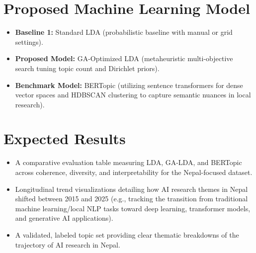 \documentclass[11pt,a4paper]{article}
\begin{document}
\section{Proposed Machine Learning Model}
\begin{itemize}
    \item \textbf{Baseline 1:} Standard LDA (probabilistic baseline
          with manual or grid settings).
    \item \textbf{Proposed Model:} GA-Optimized LDA (metaheuristic
          multi-objective search tuning topic count and Dirichlet
          priors).
    \item \textbf{Benchmark Model:} BERTopic (utilizing sentence
          transformers for dense vector spaces and HDBSCAN clustering
          to capture semantic nuances in local research).
\end{itemize}

\section{Expected Results}
\begin{itemize}
    \item A comparative evaluation table measuring LDA, GA-LDA, and
          BERTopic across coherence, diversity, and interpretability
          for the Nepal-focused dataset.
    \item Longitudinal trend visualizations detailing how AI research
          themes in Nepal shifted between 2015 and 2025 (e.g.,
          tracking the transition from traditional machine
          learning/local NLP tasks toward deep learning, transformer
          models, and generative AI applications).
    \item A validated, labeled topic set providing clear thematic
          breakdowns of the trajectory of AI research in Nepal.
\end{itemize}

\end{document}
